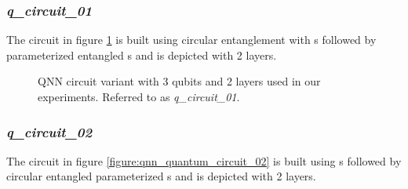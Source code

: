 \subsubsection{\textit{q\_circuit\_01}}
\label{subsubsection:qnn_quantum_circuit_01}
The circuit in figure \ref{figure:qnn_quantum_circuit_01} is built using circular entanglement with \rygate s followed by parameterized entangled \crygate s and is depicted with 2 layers. 

\begin{figure}[!h]
	\centering
	\caption{QNN circuit variant with 3 qubits and 2 layers used in our experiments. Referred to as \textit{q\_circuit\_01}.}
	\label{figure:qnn_quantum_circuit_01}
\end{figure}

\subsubsection{\textit{q\_circuit\_02}}
\label{subsubsection:qnn_quantum_circuit_02}
The circuit in figure \ref{figure:qnn_quantum_circuit_02} is built using \rygate s followed by circular entangled parameterized \crygate s and is depicted with 2 layers.

